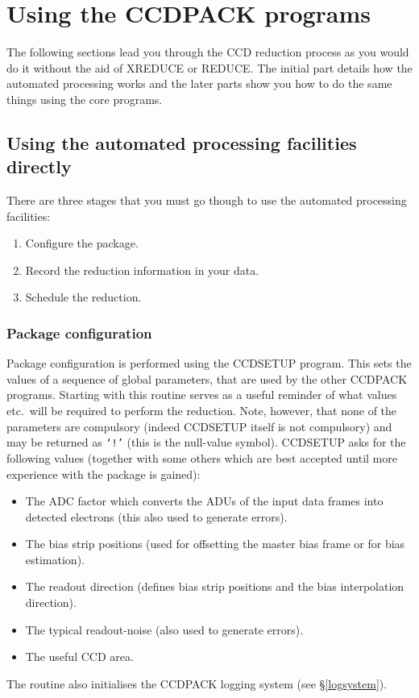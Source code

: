 \documentclass[twoside,11pt]{article}
\newcommand{\hyperref}[4]{#2\ref{#4}#3}
\newcommand{\htmlref}[2]{#1}
\newcommand{\xlabel}[1]{}
\renewcommand{\_}{\texttt{\symbol{95}}}
\newcommand{\text}[1]{{\small \tt #1}}
\newcommand{\routine}[1]{{\sc #1}}
\newcommand{\xroutine}[1]{\htmlref{{\sc #1}}{#1}}
\begin{document}
\section{Using the CCDPACK programs\xlabel{DIY}}

The following sections lead you through the CCD reduction process as
you would do it without the aid of \xroutine{XREDUCE} or
\xroutine{REDUCE}.
The initial part details how the automated processing works and the
later parts show you how to do the same things using the core programs.

\subsection{Using the automated processing facilities directly}

There are three stages that you must go though to use the automated
processing facilities:
\begin{enumerate}
\item Configure the package.
\item Record the reduction information in your data.
\item Schedule the reduction.
\end{enumerate}

\subsubsection{Package configuration\xlabel{configuration}
               \label{configuration}}
Package configuration is performed using the \xroutine{CCDSETUP}
program.
This sets the values of a sequence of global parameters, that are used
by the other CCDPACK programs.
Starting with this routine serves as a useful reminder of what values
etc.\ will be required to perform the reduction.
Note, however, that none of the parameters are compulsory (indeed
\routine{CCDSETUP} itself is not compulsory) and may be returned as \text{`!'}
(this is the null-value symbol).
\routine{CCDSETUP} asks for the following values (together with some others
which are best accepted until more experience with the package is
gained):
\begin{itemize}
\item The ADC factor which converts the
ADUs of the input data frames into detected electrons (this also
used to generate errors).
\item The bias strip positions (used for offsetting the master bias
frame or for bias estimation).
\item The readout direction (defines bias strip positions and the
bias interpolation direction).
\item The typical readout-noise (also used to generate errors).
\item The useful CCD area.
\end{itemize}
The routine also initialises the CCDPACK logging system (see
\hyperref{later}{\S}{}{logsystem}).
\end{document}
